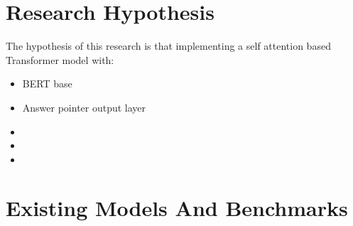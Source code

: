 \documentclass[a4paper,12pt]{report}
\begin{document}
    \section{Research Hypothesis}\label{c33}
    The hypothesis of this research is that implementing a self attention based Transformer model with:
    \begin{itemize}
    	\item BERT base\cite{bert}
    	\item Answer pointer output layer\cite{lstmPointer, lstmhu2016question}
    	\item
    	\item
    	\item
    \end{itemize}
    \section{Existing Models And Benchmarks}\label{c34}
\end{document}
